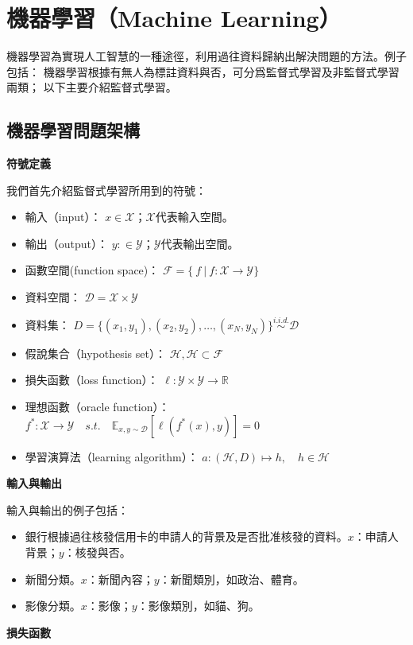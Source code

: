 \section{機器學習（Machine Learning）}
機器學習為實現人工智慧的一種途徑，利用過往資料歸納出解決問題的方法。例子包括：
機器學習根據有無人為標註資料與否，可分爲監督式學習及非監督式學習兩類；
以下主要介紹監督式學習。
\subsection{機器學習問題架構}
\vspace{12pt}
\noindent\textbf{符號定義}
\vspace{4pt}

我們首先介紹監督式學習所用到的符號：
\begin{itemize}
    \item 輸入（input）： $x \in \mathcal{X}$；$\mathcal{X}$代表輸入空間。
    \item 輸出（output）： $y: \in \mathcal{Y}$；$\mathcal{Y}$代表輸出空間。
    \item 函數空間(function space)： $\mathcal{F} = \{\ f\ |\ f: \mathcal{X} \rightarrow \mathcal{Y} \}$
    \item 資料空間： $\mathcal{D} = \mathcal{X} \times \mathcal{Y}$
    \item 資料集： $D = \{ (x_1, y_1), (x_2, y_2), \ldots, (x_N, y_N)\} \overset{i.i.d.}{\sim} \mathcal{D}$
    \item 假說集合（hypothesis set）： $\mathcal{H}, \mathcal{H} \subset \mathcal{F}$
    \item 損失函數（loss function）： $\ell: \mathcal{Y} \times \mathcal{Y} \rightarrow \mathbb{R}$
    \item 理想函數（oracle function）： $f^{*}: \mathcal{X} \rightarrow \mathcal{Y}\quad s.t.\quad \mathbb{E}_{x, y \sim \mathcal{D}}\left[\ell(f^{*}(x), y)\right] = 0$
    \item 學習演算法（learning algorithm）：  $a: \left( \mathcal{H}, D \right) \mapsto h,\quad h \in \mathcal{H}$
\end{itemize}
\vspace{12pt}
\noindent\textbf{輸入與輸出}
\vspace{4pt}

輸入與輸出的例子包括：
\begin{itemize}
    \item 銀行根據過往核發信用卡的申請人的背景及是否批准核發的資料。$x$：申請人背景；$y$：核發與否。
    \item 新聞分類。$x$：新聞內容；$y$：新聞類別，如政治、體育。
    \item 影像分類。$x$：影像；$y$：影像類別，如貓、狗。
\end{itemize}
\vspace{12pt}
\noindent\textbf{損失函數}
\vspace{4pt}

